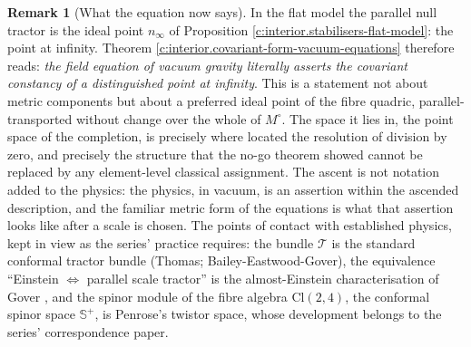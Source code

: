 \documentclass[11pt]{article}
\theoremstyle{definition}
\newtheorem{remark}[theorem]{Remark}
\theoremstyle{plain}
\newcommand{\changedmark}[2]{\marginpar{\raggedright\scriptsize\color{#1}#2}}
\providecommand{\CS}{}\renewcommand{\CS}{{\mathbb{S}^{+}}}
\providecommand{\Cl}{}\renewcommand{\Cl}{\mathrm{Cl}}
\providecommand{\nInf}{}\renewcommand{\nInf}{n_\infty}
\begin{document}
\begin{remark}[What the equation now says]\label{c:note.interior.what-equation-now-says}
\changedmark{gray}{reworded}
In the flat model the parallel null tractor is the ideal point $\nInf$ of Proposition \ref{c:interior.stabilisers-flat-model}: the point at infinity. Theorem \ref{c:interior.covariant-form-vacuum-equations} therefore reads: \emph{the field equation of vacuum gravity literally asserts the covariant constancy of a distinguished point at infinity}. This is a statement not about metric components but about a preferred ideal point of the fibre quadric, parallel-transported without change over the whole of $M^\circ$. The space it lies in, the point space of the completion, is precisely where \cite[Thm.~4.10]{ButlerT1} located the resolution of division by zero, and precisely the structure that the no-go theorem showed cannot be replaced by any element-level classical assignment. The ascent is not notation added to the physics: the physics, in vacuum, is an assertion within the ascended description, and the familiar metric form of the equations is what that assertion looks like after a scale is chosen. The points of contact with established physics, kept in view as the series' practice requires: the bundle $\mathcal{T}$ is the standard conformal tractor bundle (Thomas; Bailey-Eastwood-Gover), the equivalence ``Einstein $\Leftrightarrow$ parallel scale tractor'' is the almost-Einstein characterisation of Gover \cite{Gover2010}, and the spinor module of the fibre algebra $\Cl(2,4)$, the conformal spinor space $\CS$, is Penrose's twistor space, whose development belongs to the series' correspondence paper.
\end{remark}
\end{document}
